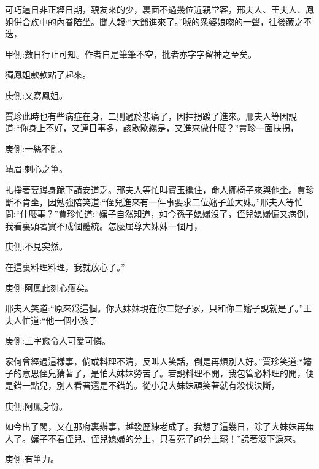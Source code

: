 \begin{parag}
    可巧這日非正經日期，親友來的少，裏面不過幾位近親堂客，邢夫人、王夫人、鳳姐併合族中的內眷陪坐。聞人報:“大爺進來了。”唬的衆婆娘唿的一聲，往後藏之不迭，\begin{note}甲側:數日行止可知。作者自是筆筆不空，批者亦字字留神之至矣。\end{note}獨鳳姐款款站了起來。\begin{note}庚側:又寫鳳姐。\end{note}賈珍此時也有些病症在身，二則過於悲痛了，因拄拐踱了進來。邢夫人等因說道:“你身上不好，又連日事多，該歇歇纔是，又進來做什麼？”賈珍一面扶拐，\begin{note}庚側:一絲不亂。\end{note}\begin{note}靖眉:刺心之筆。\end{note}扎掙著要蹲身跪下請安道乏。邢夫人等忙叫寶玉攙住，命人挪椅子來與他坐。賈珍斷不肯坐，因勉強陪笑道:“侄兒進來有一件事要求二位嬸子並大妹。”邢夫人等忙問:“什麼事？”賈珍忙道:“嬸子自然知道，如今孫子媳婦沒了，侄兒媳婦偏又病倒，我看裏頭著實不成個體統。怎麼屈尊大妹妹一個月，\begin{note}庚側:不見突然。\end{note}在這裏料理料理，我就放心了。”\begin{note}庚側:阿鳳此刻心癢矣。\end{note}邢夫人笑道:“原來爲這個。你大妹妹現在你二嬸子家，只和你二嬸子說就是了。”王夫人忙道:“他一個小孩子\begin{note}庚側:三字愈令人可愛可憐。\end{note}家何曾經過這樣事，倘或料理不清，反叫人笑話，倒是再煩別人好。”賈珍笑道:“嬸子的意思侄兒猜著了，是怕大妹妹勞苦了。若說料理不開，我包管必料理的開，便是錯一點兒，別人看著還是不錯的。從小兒大妹妹頑笑著就有殺伐決斷，\begin{note}庚側:阿鳳身份。\end{note}如今出了閣，又在那府裏辦事，越發歷練老成了。我想了這幾日，除了大妹妹再無人了。嬸子不看侄兒、侄兒媳婦的分上，只看死了的分上罷！”說著滾下淚來。\begin{note}庚側:有筆力。\end{note}
\end{parag}


